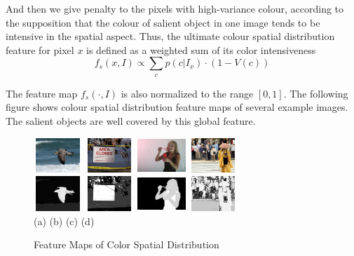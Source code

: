 \documentclass[10pt,twocolumn,letterpaper]{article}
\newcommand{\SUM}{\sum\limits}
\newcommand{\hs}{\hspace{0.58in}}
\begin{document}
And then we give penalty to the pixels with high-variance colour, according to the 
supposition that the colour of salient object in one image tends to be intensive in the 
spatial aspect. Thus, the ultimate colour spatial distribution feature for pixel $x$ is defined
as a weighted sum of its color intensiveness $$f_s(x,I)\propto\SUM_c p(c|I_x)\cdot(1-V(c))$$

The feature map $f_s (\cdot,I)$ is also normalized to the range $[0, 1]$. The following figure shows colour spatial distribution feature maps of several example images. The salient objects are well covered by this global feature. 

\begin{figure}[h]
    \begin{center}
    \includegraphics[width=0.72in,height=0.52in]{./CSD_image/1.jpg}
    \includegraphics[width=0.72in,height=0.52in]{./CSD_image/2.jpg}
    \includegraphics[width=0.72in,height=0.52in]{./CSD_image/3.jpg}
    \includegraphics[width=0.72in,height=0.52in]{./CSD_image/4.jpg}\\
    \includegraphics[width=0.72in,height=0.52in]{./CSD_image/1_CSD.jpg}
    \includegraphics[width=0.72in,height=0.52in]{./CSD_image/2_CSD.jpg}
    \includegraphics[width=0.72in,height=0.52in]{./CSD_image/3_CSD.jpg} 
    \includegraphics[width=0.72in,height=0.52in]{./CSD_image/4_CSD.jpg} \\
    \footnotesize \hspace{0.1cm} (a) \hs (b) \hs  (c) \hs (d) \\
     \caption{Feature Maps of Color Spatial Distribution} \label{Fig:GlobalFeatureMap}
    \end{center}
\end{figure}
\end{document}
